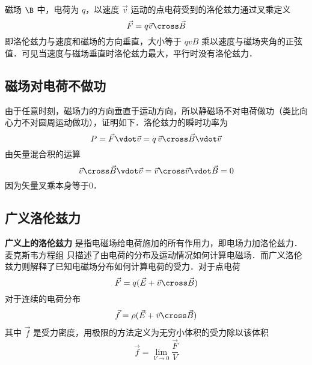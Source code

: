 磁场 $\B$ 中，电荷为 $q$，以速度 $\vec v$ 运动的点电荷受到的洛伦兹力通过叉乘定义
\begin{equation}
\vec F = q\vec v \cross \vec B
\end{equation}
即洛伦兹力与速度和磁场的方向垂直，大小等于 $qvB$ 乘以速度与磁场夹角的正弦值．可见当速度与磁场垂直时洛伦兹力最大，平行时没有洛伦兹力．

\subsection{磁场对电荷不做功}
由于任意时刻，磁场力的方向垂直于运动方向，所以静磁场不对电荷做功（类比向心力不对圆周运动做功），证明如下．洛伦兹力的瞬时功率为
\begin{equation}
P = \vec F \vdot \vec v = q\,\vec v \cross \vec B \vdot \vec v
\end{equation}
由矢量混合积的运算 %
\begin{equation}
\vec v \cross \vec B \vdot \vec v = \vec v \cross \vec v \vdot \vec B = 0
\end{equation}
因为矢量叉乘本身等于0．


\subsection{广义洛伦兹力}
\textbf{广义上的洛伦兹力} 是指电磁场给电荷施加的所有作用力，即电场力加洛伦兹力．麦克斯韦方程组%
只描述了由电荷的分布及运动情况如何计算电磁场．而广义洛伦兹力则解释了已知电磁场分布如何计算电荷的受力．对于点电荷
\begin{equation}
\vec F = q ( {\vec E + \vec v \cross \vec B})
\end{equation}
对于连续的电荷分布
\begin{equation}
\vec f = \rho ({\vec E + \vec v \cross \vec B})
\end{equation}
其中 $\vec f$ 是受力密度，用极限的方法定义为无穷小体积的受力除以该体积
\begin{equation}
\vec f = \lim_{V \to 0} \frac{{\vec F}}{V}
\end{equation}

